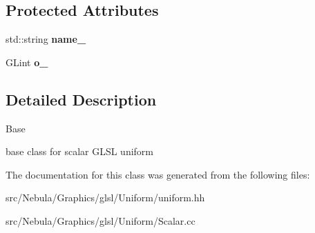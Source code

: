 \subsection*{\-Protected \-Attributes}
\begin{DoxyCompactItemize}
\item 
\hypertarget{classNeb_1_1glsl_1_1Uniform_1_1Scalar_1_1Base_af4f8e92fee448c545de153937a419abe}{std\-::string {\bfseries name\-\_\-}}\label{classNeb_1_1glsl_1_1Uniform_1_1Scalar_1_1Base_af4f8e92fee448c545de153937a419abe}

\item 
\hypertarget{classNeb_1_1glsl_1_1Uniform_1_1Scalar_1_1Base_ac57d0525c2866193e87adde9b8ef36fe}{\-G\-Lint {\bfseries o\-\_\-}}\label{classNeb_1_1glsl_1_1Uniform_1_1Scalar_1_1Base_ac57d0525c2866193e87adde9b8ef36fe}

\end{DoxyCompactItemize}


\subsection{\-Detailed \-Description}
\-Base 

base class for scalar \-G\-L\-S\-L uniform 

\-The documentation for this class was generated from the following files\-:\begin{DoxyCompactItemize}
\item 
src/\-Nebula/\-Graphics/glsl/\-Uniform/uniform.\-hh\item 
src/\-Nebula/\-Graphics/glsl/\-Uniform/\-Scalar.\-cc\end{DoxyCompactItemize}
